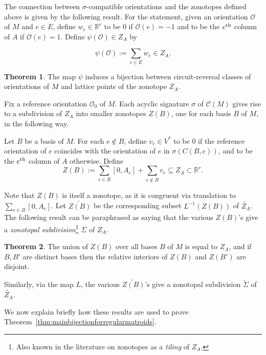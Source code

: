 \documentclass[12pt]{amsart}
\newcommand{\RR}{\mathbb{R}}
\numberwithin{equation}{section}
\theoremstyle{definition}
\newtheorem{theorem}{Theorem}[subsection]
\begin{document}
The connection between $\sigma$-compatible orientations and the zonotopes defined above is given by the following result.
For the statement, given an orientation $\mathcal{O}$ of $M$ and $e \in E$, define $w_e \in \RR^r$ to be $0$ if $\mathcal{O}(e) = -1$ and 
to be the $e^{\rm th}$ column of $A$ if $\mathcal{O}(e) = 1$.
Define $\psi(\mathcal{O}) \in Z_A$ by

\begin{equation}
\psi(\mathcal{O}) := \sum_{e \in E} w_e \in Z_A.
\end{equation}

\begin{theorem}
The map $\psi$ induces a bijection between circuit-reversal classes of orientations of $M$ and lattice points of the zonotope $Z_A$.
\end{theorem}

Fix a reference orientation $\mathcal{O}_0$ of $M$.
Each acyclic signature $\sigma$ of ${\mathcal C}(M)$ gives rise to a subdivision of $Z_A$ into smaller zonotopes $Z(B)$, one for each basis $B$ of $M$,
in the following way.

Let $B$ be a basis of $M$.  For each $e \not\in B$, define $v_e \in V^*$ to be $0$ if the reference orientation of $e$ coincides with the orientation of $e$
in $\sigma(C(B,e))$, and to be the $e^{\rm th}$ column of $A$ otherwise.
Define 
\[
Z(B) := \sum_{e \in B} [0,A_e] + \sum_{e \not\in B} v_e \subseteq Z_A \subset \RR^r.
\]

Note that $Z(B)$ is itself a zonotope, as it is congruent via translation to $\sum_{e \in B} [0,A_e]$.
Let $\widetilde{Z(B)}$ be the corresponding subset $L^{-1}(Z(B))$ of $\widetilde{Z_A}$.
The following result can be paraphrased as saying that the various $Z(B)$'s give a {\em zonotopal subdivision}\footnote{Also known in the literature on zonotopes as a {\em tiling} of $Z_A$.} $\Sigma$ of $Z_A$.

\begin{theorem} 
The union of $Z(B)$ over all bases $B$ of $M$ is equal to $Z_A$, and if $B,B'$ are distinct bases then the relative interiors of $Z(B)$ and $Z(B')$ are disjoint.
\end{theorem}

Similarly, via the map $L$, the various $\widetilde{Z(B)}$'s give a zonotopal subdivision $\widetilde{\Sigma}$ of $\widetilde{Z_A}$.

\medskip

We now explain briefly how these results are used to prove 
Theorem~\ref{thm:mainbijectionforregularmatroids}.  
\end{document}
